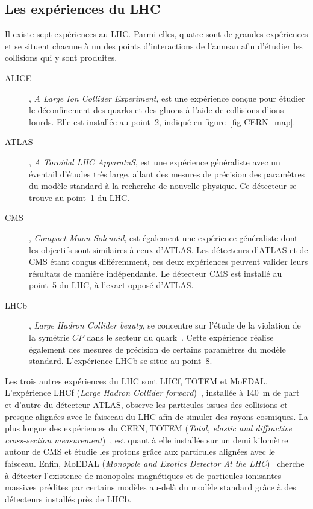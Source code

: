 \subsection{Les expériences du LHC}\label{chapter-LHC-section-LHC-subsec-experiments}
Il existe sept expériences au LHC.
Parmi elles, quatre sont de \og grandes expériences \fg{} et se situent chacune à un des points d'interactions de l'anneau afin d'étudier les collisions qui y sont produites.
\begin{description}
\item[ALICE]\cite{alice_paper}, \emph{A Large Ion Collider Experiment}, est une expérience conçue pour étudier le déconfinement des quarks et des gluons à l'aide de collisions d'ions lourds.
Elle est installée au point~2, indiqué en figure~\ref{fig-CERN_map}.%
\item[ATLAS]\cite{atlas_paper}, \emph{A Toroidal LHC ApparatuS}, est une expérience généraliste avec un éventail d'études très large, allant des mesures de précision des paramètres du modèle standard à la recherche de nouvelle physique. Ce détecteur se trouve au point~1 du LHC.
\item[CMS]\cite{cms_paper}, \emph{Compact Muon Solenoid}, est également une expérience généraliste dont les objectifs sont similaires à ceux d'ATLAS. Les détecteurs d'ATLAS et de CMS étant conçus différemment, ces deux expériences peuvent valider leurs résultats de manière indépendante. Le détecteur CMS est installé au point~5 du LHC, à l'exact opposé d'ATLAS.
\item[LHCb]\cite{lhcb_paper}, \emph{Large Hadron Collider beauty}, se concentre sur l'étude de la violation de la symétrie $CP$ dans le secteur du quark~\quarkb. Cette expérience réalise également des mesures de précision de certains paramètres du modèle standard. L'expérience LHCb se situe au point~8.
\end{description}
\par Les trois autres expériences du LHC sont LHCf, TOTEM et MoEDAL.
L'expérience LHCf (\emph{Large Hadron Collider forward})~\cite{lhcf_paper}, installée à \SI{140}{\meter} de part et d'autre du détecteur ATLAS, observe les particules issues des collisions et presque alignées avec le faisceau du LHC afin de simuler des rayons cosmiques.
La plus \og longue \fg{} des expériences du CERN, TOTEM (\emph{Total, elastic and diffractive cross-section measurement})~\cite{totem_paper}, est quant à elle installée sur un demi kilomètre autour de CMS et étudie les protons grâce aux particules alignées avec le faisceau.
Enfin, MoEDAL (\emph{Monopole and Exotics Detector At the LHC})~\cite{moedal_paper} cherche à détecter l'existence de monopoles magnétiques et de particules ionisantes massives prédites par certains modèles au-delà du modèle standard grâce à des détecteurs installés près de LHCb.
